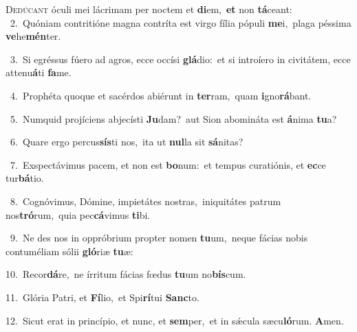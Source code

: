 \lettrine{\initial\textcolor{\initialcolor}{D}}{edúcant} óculi mei lácrimam per noctem et \textbf{di}\-em,~\star \textbf{et} non \textbf{tá}\-ceant:\\
{\numbfont\textcolor{\numbcolor}{~2.}}~Quóniam contritióne magna contríta est virgo fília pópuli \textbf{me}\-i,~\star plaga péssima \textbf{ve}\-he\-\textbf{mén}\-ter.\par
{\numbfont\textcolor{\numbcolor}{~3.}}~Si egréssus fúero ad agros, ecce occísi \textbf{glá}\-dio:~\star et si introíero in civitátem, ecce attenu\-\textbf{á}\-ti \textbf{fa}\-me.\par
{\numbfont\textcolor{\numbcolor}{~4.}}~Prophéta quoque et sacérdos abiérunt in \textbf{ter}\-ram,~\star quam \textbf{i}\-gno\-\textbf{rá}\-bant.\par
{\numbfont\textcolor{\numbcolor}{~5.}}~Numquid projíciens abjecísti \textbf{Ju}\-dam?~\star aut Sion abomináta est \textbf{á}\-nima \textbf{tu}\-a?\par
{\numbfont\textcolor{\numbcolor}{~6.}}~Quare ergo percus\-\textbf{sís}\-ti nos,~\star ita ut \textbf{nul}\-la sit \textbf{sá}\-nitas?\par
{\numbfont\textcolor{\numbcolor}{~7.}}~Exspectávimus pacem, et non est \textbf{bo}\-num:~\star et tempus curatiónis, et \textbf{ec}\-ce tur\-\textbf{bá}\-tio.\par
{\numbfont\textcolor{\numbcolor}{~8.}}~Cognóvimus, Dómine, impietátes nostras,~\dagger iniquitátes patrum nos\-\textbf{tró}\-rum,~\star quia pec\-\textbf{cá}\-vimus \textbf{ti}\-bi.\par
{\numbfont\textcolor{\numbcolor}{~9.}}~Ne des nos in oppróbrium propter nomen \textbf{tu}\-um,~\star neque fácias nobis contuméliam sólii \textbf{gló}\-riæ \textbf{tu}\-æ:\par
{\numbfont\textcolor{\numbcolor}{10.}}~Recor\-\textbf{dá}\-re,~\star ne írritum fácias fœdus \textbf{tu}\-um no\-\textbf{bís}\-cum.\par
{\numbfont\textcolor{\numbcolor}{11.}}~Glória Patri, et \textbf{Fí}\-lio,~\star et Spi\-\textbf{rí}\-tui \textbf{Sanc}\-to.\par
{\numbfont\textcolor{\numbcolor}{12.}}~Sicut erat in princípio, et nunc, et \textbf{sem}\-per,~\star et in sǽcula sæcu\-\textbf{ló}\-rum. \textbf{A}\-men.\par
